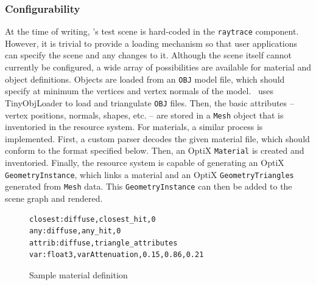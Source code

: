 \subsubsection{Configurability} \label{ch:methods:renderer:parallel:config}

At the time of writing, \name's test scene is hard-coded in the \texttt{raytrace} component.
However, it is trivial to provide a loading mechanism so that user applications can specify the scene and any changes to it.
Although the scene itself cannot currently be configured, a wide array of possibilities are available for material and object definitions.
Objects are loaded from an \texttt{OBJ} model file, which should specify at minimum the vertices and vertex normals of the model.
\name\ uses TinyObjLoader \cite{tinyobjloader} to load and triangulate \texttt{OBJ} files.
Then, the basic attributes -- vertex positions, normals, shapes, etc. -- are stored in a \texttt{Mesh} object that is inventoried in the resource system.
For materials, a similar process is implemented.
First, a custom parser decodes the given material file, which should conform to the format specified below.
Then, an OptiX \texttt{Material} is created and inventoried.
Finally, the resource system is capable of generating an OptiX \texttt{GeometryInstance}, which links a material and an OptiX \texttt{GeometryTriangles} generated from \texttt{Mesh} data.
This \texttt{GeometryInstance} can then be added to the scene graph and rendered.

\vspace{0.3em}
\begin{figure}[htb]
\centering
\begin{mdframed}[style=MyFrame,nobreak=true,align=center,userdefinedwidth=30em]
\begin{verbatim}
closest:diffuse,closest_hit,0
any:diffuse,any_hit,0
attrib:diffuse,triangle_attributes
var:float3,varAttenuation,0.15,0.86,0.21
\end{verbatim}
\end{mdframed}
\vspace{-0.3em}
\caption{Sample material definition}
\label{fig:rayterm-gpu_material_def}
\end{figure}

